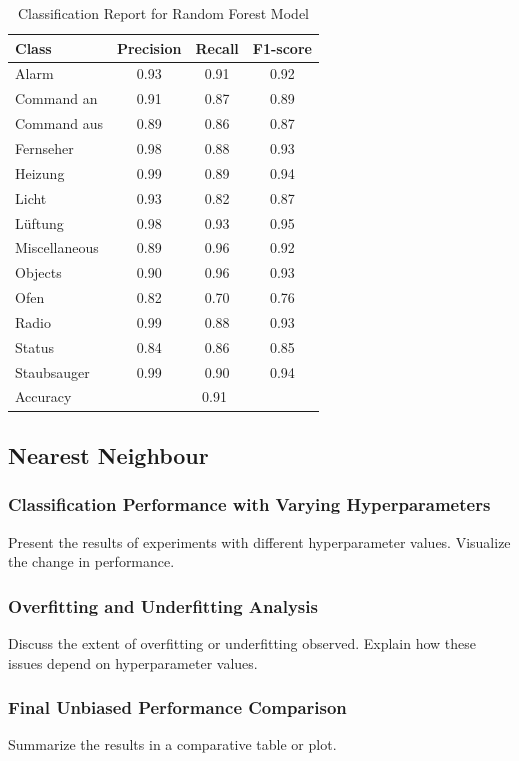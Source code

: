 \begin{table}
  \caption{Classification Report for Random Forest Model}
  \label{tab:classification_report}
  \centering
  \begin{tabular}{lccc}
    \toprule
    Class        & Precision & Recall & F1-score \\
    \midrule
    Alarm        & 0.93 & 0.91 & 0.92 \\
    Command an   & 0.91 & 0.87 & 0.89 \\
    Command aus  & 0.89 & 0.86 & 0.87 \\
    Fernseher    & 0.98 & 0.88 & 0.93 \\
    Heizung      & 0.99 & 0.89 & 0.94 \\
    Licht        & 0.93 & 0.82 & 0.87 \\
    Lüftung      & 0.98 & 0.93 & 0.95 \\
    Miscellaneous & 0.89 & 0.96 & 0.92 \\
    Objects      & 0.90 & 0.96 & 0.93 \\
    Ofen         & 0.82 & 0.70 & 0.76 \\
    Radio        & 0.99 & 0.88 & 0.93 \\
    Status       & 0.84 & 0.86 & 0.85 \\
    Staubsauger  & 0.99 & 0.90 & 0.94 \\
    \midrule
    Accuracy     & \multicolumn{3}{c}{0.91} \\
    \bottomrule
  \end{tabular}
\end{table}

\subsection{Nearest Neighbour}
\subsubsection{Classification Performance with Varying Hyperparameters}
Present the results of experiments with different hyperparameter values. Visualize the change in performance.
\subsubsection{Overfitting and Underfitting Analysis}
Discuss the extent of overfitting or underfitting observed. Explain how these issues depend on hyperparameter values.
\subsubsection{Final Unbiased Performance Comparison}
Summarize the results in a comparative table or plot.

